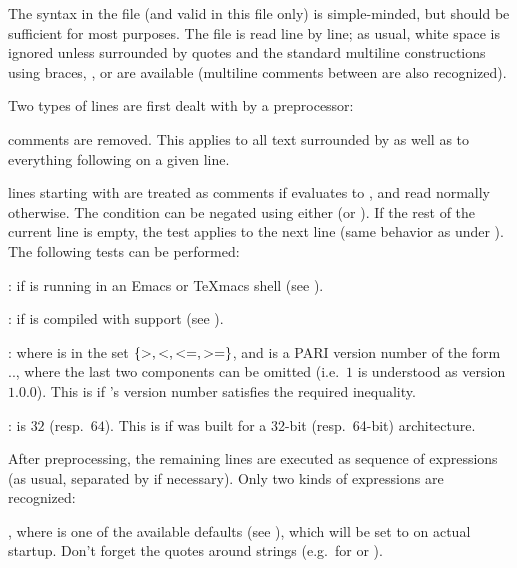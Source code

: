  The syntax in the  file (and valid in this file
only) is simple-minded, but should be sufficient for most purposes. The file
is read line by line; as usual, white space is ignored unless surrounded by
quotes and the standard multiline constructions using braces, \kbd{\bs}, or
\kbd{=} are available (multiline comments between \kbd{/*~\dots~*/} are also
recognized).

Two types of lines are first dealt with by a preprocessor:

\item comments are removed. This applies to all text surrounded by
\kbd{/*~\dots~*/} as well as to everything following \kbd{\bs\bs} on a given
line.

\item lines starting with   are treated as
comments if  evaluates to , and read normally
otherwise. The condition can be negated using either  (or
). If the rest of the current line is empty, the test applies to
the next line (same behavior as \kbd{=} under ). The following
tests can be performed:

:  if  is running in an Emacs or TeXmacs shell (see
).

:  if  is compiled with  support (see
).

  : where  is in the set
$\{ {\tt >}, {\tt <}, {\tt <=}, {\tt >=} \}$, and  is a PARI
version number of the form .., where the
last two components can be omitted (i.e.~$1$ is understood as version $1.0.0$).
This is  if 's version number satisfies the required
inequality.

 \kbd{==} :  is $32$ (resp.~$64$).
This is  if  was built for a 32-bit (resp.~64-bit)
architecture.

After preprocessing, the remaining lines are executed as
sequence of expressions (as usual, separated by \kbd{;} if necessary). Only
two kinds of expressions are recognized:

\item {} \kbd{=} , where  is one of
the available defaults (see ), which will be set to
 on actual startup. Don't forget the quotes around strings
(e.g.~for  or ).

